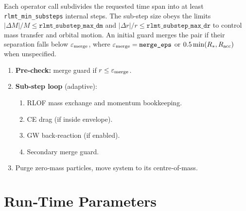 \documentclass[11pt]{article}
\begin{document}
Each operator call subdivides the requested time span into at least
\texttt{rlmt\_min\_substeps} internal steps.  The sub‑step size obeys the
limits $|\Delta M|/M\le\texttt{rlmt\_substep\_max\_dm}$ and
$|\Delta r|/r\le\texttt{rlmt\_substep\_max\_dr}$ to control mass transfer and
orbital motion.  An initial guard merges the pair if their separation falls
below $\varepsilon_{\rm merge}$, where
$\varepsilon_{\rm merge}=\texttt{merge\_eps}$ or
$0.5\min(R_{*},R_{\rm acc})$ when unspecified.

\begin{enumerate}[nosep]
\item \textbf{Pre‑check:} merge guard if $r\le\varepsilon_{\rm merge}$.
\item \textbf{Sub‑step loop} (adaptive):
  \begin{enumerate}[nosep]
    \item RLOF mass exchange and momentum bookkeeping.
    \item CE drag (if inside envelope).
    \item GW back‑reaction (if enabled).
    \item Secondary merge guard.
  \end{enumerate}
\item Purge zero‑mass particles, move system to its centre‑of‑mass.
\end{enumerate}

\section{Run‑Time Parameters}
\label{sec:param_table}
\end{document}
